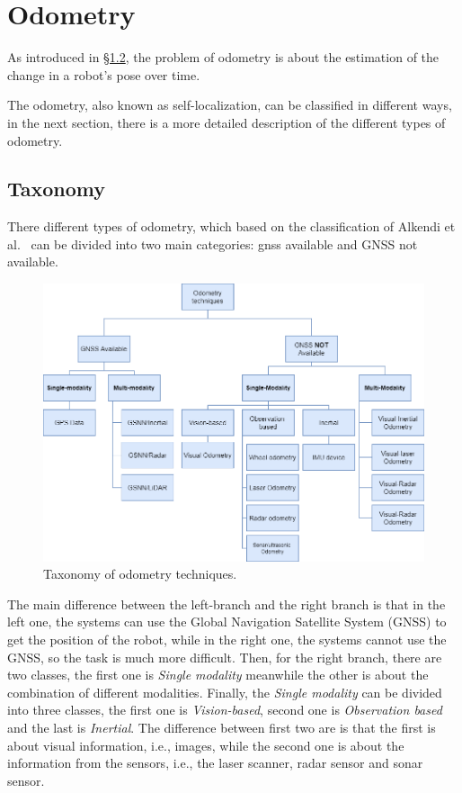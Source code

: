 \section{Odometry}\label{sec:visual-odometry}
As introduced in \hyperref[sec:the-problem]{\S1.2}, the problem of odometry is about the estimation of the change in a robot's pose over time.

The odometry, also known as self-localization, can be classified in different ways, in the next section, there is a more detailed description of the different types of odometry.

\subsection{Taxonomy}\label{subsec:tassonomy}
There different types of odometry, which based on the classification of Alkendi et al.~\cite{vo_state_of_art} can be divided into two main categories: \gls{gnss} available and GNSS not available.
\begin{figure}[H]
    \centering
    \includegraphics[width=\textwidth]{images/2_2_taxonomy_odometry}
    \caption{Taxonomy of odometry techniques.}\label{fig:odometry-taxonomy}
\end{figure}
The main difference between the left-branch and the right branch is that in the left one, the systems can use the Global Navigation Satellite System (GNSS) to get the position of the robot, while in the right one, the systems cannot use the GNSS, so the task is much more difficult.
Then, for the right branch, there are two classes, the first one is \textit{Single modality} meanwhile the other is about the combination of different modalities.
Finally, the \textit{Single modality} can be divided into three classes, the first one is \textit{Vision-based}, second one is \textit{Observation based} and the last is \textit{Inertial}.
The difference between first two are is that the first is about visual information, i.e., images, while the second one is about the information from the sensors, i.e., the laser scanner, radar sensor and sonar sensor.

